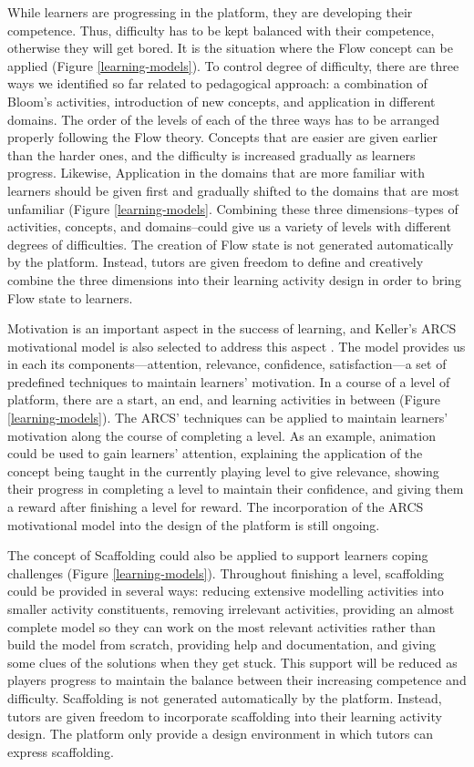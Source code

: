 \documentclass[12pt, a4paper]{report} \usepackage[titletoc]{appendix}
\begin{document}
While learners are progressing in the platform, they are developing their competence. Thus, difficulty has to be kept balanced with their competence, otherwise they will get bored. It is the situation where the Flow concept \cite{csikszentmihalyi2014toward} can be applied (Figure \ref{learning-models}). To control degree of difficulty, there are three ways we identified so far related to pedagogical approach: a combination of Bloom's activities, introduction of new concepts, and application in different domains. The order of the levels of each of the three ways has to be arranged properly following the Flow theory. Concepts that are easier are given earlier than the harder ones, and the difficulty is increased gradually as learners progress. Likewise, Application in the domains that are more familiar with learners should be given first and gradually shifted to the domains that are most unfamiliar (Figure \ref{learning-models}. Combining these three dimensions--types of activities, concepts, and domains--could give us a variety of levels with different degrees of difficulties. The creation of Flow state is not generated automatically by the platform. Instead, tutors are given freedom to define and creatively combine the three dimensions into their learning activity design in order to bring Flow state to learners.

Motivation is an important aspect in the success of learning, and Keller's ARCS motivational model is also selected to address this aspect \cite{keller2010motivational}. The model provides us in each its components---attention, relevance, confidence, satisfaction---a set of predefined techniques to maintain learners' motivation. In a course of a level of platform, there are a start, an end, and learning activities in between (Figure \ref{learning-models}). The ARCS' techniques can be applied to maintain learners' motivation along the course of completing a level. As an example, animation could be used to gain learners' attention, explaining the application of the concept being taught in the currently playing level to give relevance, showing their progress in completing a level to maintain their confidence, and giving them a reward after finishing a level for reward. The incorporation of the ARCS motivational model into the design of the platform is still ongoing.
 
The concept of Scaffolding \cite{vygotsky1978mind, wood1976role} could also be applied to support learners coping challenges (Figure \ref{learning-models}). Throughout finishing a level, scaffolding could be provided in several ways: reducing extensive modelling activities into smaller activity constituents, removing irrelevant activities, providing an almost complete model so they can work on the most relevant activities rather than build the model from scratch, providing help and documentation, and giving some clues of the solutions when they get stuck. This support will be reduced as players progress to maintain the balance between their increasing competence and difficulty. Scaffolding is not generated automatically by the platform. Instead, tutors are given freedom to incorporate scaffolding into their learning activity design. The platform only provide a design environment in which tutors can express scaffolding.
\end{document}
